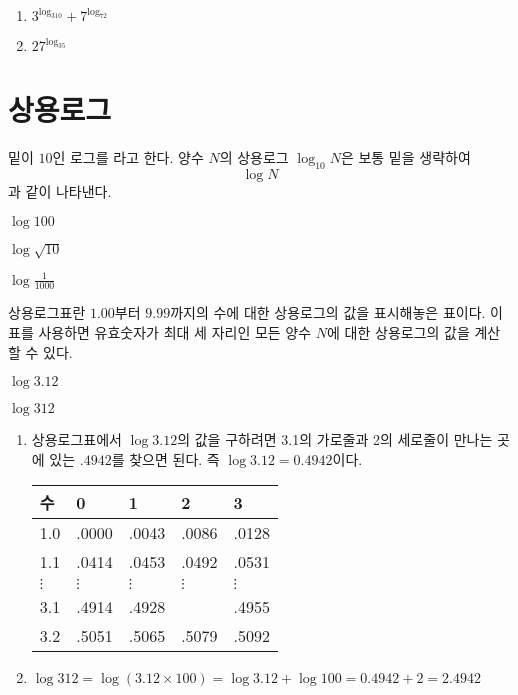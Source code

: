 \documentclass{oblivoir}
\begin{document}
%
\begin{enumerate}\label{prop17}
\item
\(3^{\log_310}+7^{\log_72}\)
\item
\(27^{\log_35}\)
\end{enumerate}

\section{상용로그}

밑이 \(10\)인 로그를 라고 한다.
양수 \(N\)의 상용로그 \(\log_{10}N\)은 보통 밑을 생략하여
\[\log N\]
과 같이 나타낸다.

%
\label{common1}
\vspace{-10pt}\par\noindent
\begin{enumerate*}[itemjoin=\qquad\qquad\qquad]
\item
\(\log100\)
\item
\(\log\sqrt{10}\)
\item
\(\log\frac1{1000}\)
\end{enumerate*}

\bigskip\bigskip
상용로그표란 \(1.00\)부터 \(9.99\)까지의 수에 대한 상용로그의 값을 표시해놓은 표이다.
이 표를 사용하면 유효숫자가 최대 세 자리인 모든 양수 \(N\)에 대한 상용로그의 값을 계산할 수 있다.

%
\label{common2}
\begin{enumerate*}[itemjoin=\tabto{.5\textwidth}]
\item
\(\log 3.12\)
\item
\(\log 312\)
\end{enumerate*}
\begin{mdframed}[nobreak=false]
\begin{enumerate}
\item
상용로그표에서 \(\log3.12\)의 값을 구하려면 3.1의 가로줄과 2의 세로줄이 만나는 곳에 있는 \(.4942\)를 찾으면 된다.
즉 \(\log 3.12=0.4942\)이다.
\begin{center}
\begin{tabu}to.5\textwidth{X[c]|X[c]X[c]X[c]X[c]}
수	&0		&1		&2		&3\\	&.0000	&.0043	&.0086	&.0128\\
1.1	&.0414	&.0453	&.0492	&.0531\\
\(\vdots\)&\(\vdots\) 	&\(\vdots\)	&\(\vdots\)	&\(\vdots\)\\
3.1	&.4914	&.4928	&	&.4955\\
3.2	&.5051	&.5065	&.5079	&.5092
\end{tabu}
\end{center}
\item
\(\log312=\log(3.12\times100)=\log3.12+\log100=0.4942+2=2.4942\)
\end{enumerate}
\end{mdframed}
\end{document}

